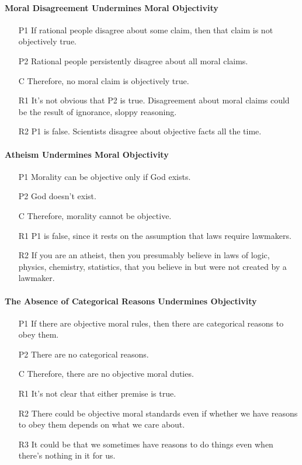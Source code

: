 \documentclass[12pt]{article}
\begin{document}
\paragraph{Moral Disagreement Undermines Moral Objectivity}
\begin{itemize}
    \item [P1] If rational people disagree about some claim, then that claim is not objectively true.
    \item [P2] Rational people persistently disagree about all moral claims.
    \item [C] Therefore, no moral claim is objectively true.
    \item [R1] It's not obvious that P2 is true. Disagreement about moral claims could be the result of ignorance, sloppy reasoning.
    \item [R2] P1 is false. Scientists disagree about objective facts all the time.
\end{itemize}

\paragraph{Atheism Undermines Moral Objectivity}
\begin{itemize}
    \item [P1] Morality can be objective only if God exists.
    \item [P2] God doesn't exist.
    \item [C] Therefore, morality cannot be objective.
    \item [R1] P1 is false, since it rests on the assumption that laws require lawmakers.
    \item [R2] If you are an atheist, then you presumably believe in laws of logic, physics, chemistry, statistics, that you believe in but were not created by a lawmaker.
\end{itemize}

\paragraph{The Absence of Categorical Reasons Undermines Objectivity}
\begin{itemize}
    \item [P1] If there are objective moral rules, then there are categorical reasons to obey them.
    \item [P2] There are no categorical reasons.
    \item [C] Therefore, there are no objective moral duties.
    \item [R1] It's not clear that either premise is true.
    \item [R2] There could be objective moral standards even if whether we have reasons to obey them depends on what we care about.
    \item [R3] It could be that we sometimes have reasons to do things even when there's nothing in it for us.
\end{itemize}
\end{document}
